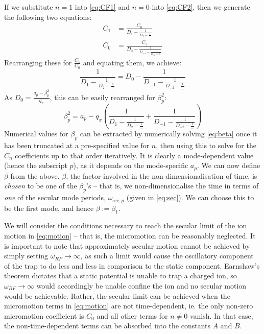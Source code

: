 \documentclass{article}
\begin{document}
\medskip
\noindent If we substitute $n = 1$ into \eqref{eq:CF1} and $n = 0$ into \eqref{eq:CF2}, then we generate the following two equations:
\begin{align}
C_1 & = \frac{C_0}{D_1 - \frac{1}{D_2 - \frac{1}{\dots}}} \\
C_0 & = \frac{C_1}{D_0 - \frac{1}{D_{-1} - \frac{1}{D_{-2} - \frac{1}{\dots}}}}
\end{align}
Rearranging these for $\frac{C_1}{C_0}$ and equating them, we achieve:
\begin{equation}
\frac{1}{D_1 - \frac{1}{D_2 - \frac{1}{\dots}}}	= D_0 - \frac{1}{D_{-1} - \frac{1}{D_{-2} - \frac{1}{\dots}}}
\end{equation}
As $D_0 = \frac{a_p - \beta_p^2}{q_x}$, this can be easily rearranged for $\beta_p^2$:
\begin{equation}
\beta_p^2 = a_p - q_x \left( \frac{1}{D_1 - \frac{1}{D_2 - \frac{1}{\dots}}} + \frac{1}{D_{-1} - \frac{1}{D_{-2} - \frac{1}{\dots}}} \right) \label{eq:beta}
\end{equation}
Numerical values for $\beta_p$ can be extracted by numerically solving \eqref{eq:beta} once it has been truncated at a pre-specified value for $n$, then using this to solve for the $C_{n}$ coefficients up to that order iteratively. It is clearly a mode-dependent value (hence the subscript $p$), as it depends on the mode-specific $a_p$. We can now define $\beta$ from the above. $\beta$, the factor involved in the non-dimensionalisation of time, is \textit{chosen} to be one of the $\beta_p$'s -- that is, we non-dimensionalise the time in terms of \textit{one} of the secular mode periods, $\omega_{\text{sec},p}$ (given in \eqref{eq:sec}). We can choose this to be the first mode, and hence $\beta := \beta_1$. \par
\medskip
\noindent We will consider the conditions necessary to reach the secular limit of the ion motion in \eqref{eq:motion} -- that is, the micromotion can be reasonably neglected. It is important to note that approximately secular motion cannot be achieved by simply setting $\omega_{RF} \rightarrow \infty$, as such a limit would cause the oscillatory component of the trap to do less and less in comparison to the static component. Earnshaw's theorem dictates that a static potential is unable to trap a charged ion, so $\omega_{RF} \rightarrow \infty$ would accordingly be unable confine the ion and no secular motion would be achievable. Rather, the secular limit can be achieved when the micromotion terms in \eqref{eq:motion} are not time-dependent, ie. the only non-zero micromotion coefficient is $C_0$ and all other terms for $n \neq 0$ vanish. In that case, the non-time-dependent terms can be absorbed into the constants $A$ and $B$. \par
\end{document}
